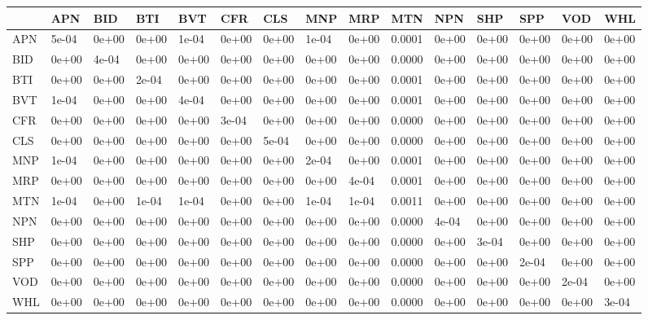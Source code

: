 \documentclass[11pt,preprint, authoryear]{elsarticle}
\let\origtable\table
\let\endorigtable\endtable
\renewenvironment{table}[1][2] {
    \expandafter\origtable\expandafter[H]
} {
    \endorigtable
}
\numberwithin{equation}{section}
\numberwithin{figure}{section}
\numberwithin{table}{section}
\begin{document}
\begin{table}[H]

\caption{\label{tab:Covariance Matrix_I}Covariance Matrix: Industrial}
\centering
\begin{tabular}[t]{l|l|l|l|l|l|l|l|l|l|l|l|l|l|l}
\hline
  & APN & BID & BTI & BVT & CFR & CLS & MNP & MRP & MTN & NPN & SHP & SPP & VOD & WHL\\
\hline
APN & 5e-04 & 0e+00 & 0e+00 & 1e-04 & 0e+00 & 0e+00 & 1e-04 & 0e+00 & 0.0001 & 0e+00 & 0e+00 & 0e+00 & 0e+00 & 0e+00\\
\hline
BID & 0e+00 & 4e-04 & 0e+00 & 0e+00 & 0e+00 & 0e+00 & 0e+00 & 0e+00 & 0.0000 & 0e+00 & 0e+00 & 0e+00 & 0e+00 & 0e+00\\
\hline
BTI & 0e+00 & 0e+00 & 2e-04 & 0e+00 & 0e+00 & 0e+00 & 0e+00 & 0e+00 & 0.0001 & 0e+00 & 0e+00 & 0e+00 & 0e+00 & 0e+00\\
\hline
BVT & 1e-04 & 0e+00 & 0e+00 & 4e-04 & 0e+00 & 0e+00 & 0e+00 & 0e+00 & 0.0001 & 0e+00 & 0e+00 & 0e+00 & 0e+00 & 0e+00\\
\hline
CFR & 0e+00 & 0e+00 & 0e+00 & 0e+00 & 3e-04 & 0e+00 & 0e+00 & 0e+00 & 0.0000 & 0e+00 & 0e+00 & 0e+00 & 0e+00 & 0e+00\\
\hline
CLS & 0e+00 & 0e+00 & 0e+00 & 0e+00 & 0e+00 & 5e-04 & 0e+00 & 0e+00 & 0.0000 & 0e+00 & 0e+00 & 0e+00 & 0e+00 & 0e+00\\
\hline
MNP & 1e-04 & 0e+00 & 0e+00 & 0e+00 & 0e+00 & 0e+00 & 2e-04 & 0e+00 & 0.0001 & 0e+00 & 0e+00 & 0e+00 & 0e+00 & 0e+00\\
\hline
MRP & 0e+00 & 0e+00 & 0e+00 & 0e+00 & 0e+00 & 0e+00 & 0e+00 & 4e-04 & 0.0001 & 0e+00 & 0e+00 & 0e+00 & 0e+00 & 0e+00\\
\hline
MTN & 1e-04 & 0e+00 & 1e-04 & 1e-04 & 0e+00 & 0e+00 & 1e-04 & 1e-04 & 0.0011 & 0e+00 & 0e+00 & 0e+00 & 0e+00 & 0e+00\\
\hline
NPN & 0e+00 & 0e+00 & 0e+00 & 0e+00 & 0e+00 & 0e+00 & 0e+00 & 0e+00 & 0.0000 & 4e-04 & 0e+00 & 0e+00 & 0e+00 & 0e+00\\
\hline
SHP & 0e+00 & 0e+00 & 0e+00 & 0e+00 & 0e+00 & 0e+00 & 0e+00 & 0e+00 & 0.0000 & 0e+00 & 3e-04 & 0e+00 & 0e+00 & 0e+00\\
\hline
SPP & 0e+00 & 0e+00 & 0e+00 & 0e+00 & 0e+00 & 0e+00 & 0e+00 & 0e+00 & 0.0000 & 0e+00 & 0e+00 & 2e-04 & 0e+00 & 0e+00\\
\hline
VOD & 0e+00 & 0e+00 & 0e+00 & 0e+00 & 0e+00 & 0e+00 & 0e+00 & 0e+00 & 0.0000 & 0e+00 & 0e+00 & 0e+00 & 2e-04 & 0e+00\\
\hline
WHL & 0e+00 & 0e+00 & 0e+00 & 0e+00 & 0e+00 & 0e+00 & 0e+00 & 0e+00 & 0.0000 & 0e+00 & 0e+00 & 0e+00 & 0e+00 & 3e-04\\
\hline
\end{tabular}
\end{table}
\end{document}
